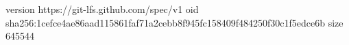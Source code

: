 version https://git-lfs.github.com/spec/v1
oid sha256:1cefce4ae86aad115861faf71a2cebb8f945fc158409f484250f30c1f5edce6b
size 645544
